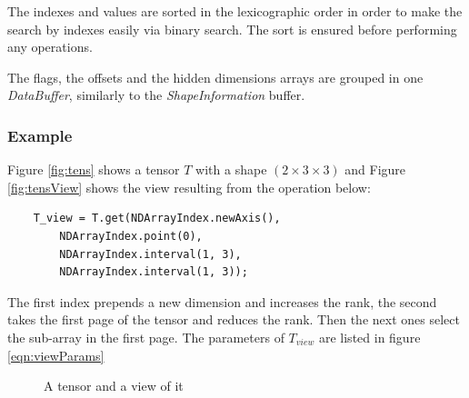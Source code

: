 		The indexes and values are sorted in the lexicographic order in order to make the search by indexes easily via binary search. The sort is ensured before performing any operations.
		
		The flags, the offsets and the hidden dimensions arrays are grouped in one \textit{DataBuffer}, similarly to the \textit{ShapeInformation} buffer.
		
\subsubsection{Example}
Figure \ref{fig:tens} shows a tensor $T$ with a shape $(2\times 3\times 3)$ and Figure \ref{fig:tensView} shows the view resulting from the operation below:

\begin{lstlisting}
	T_view = T.get(NDArrayIndex.newAxis(), 
		NDArrayIndex.point(0),
		NDArrayIndex.interval(1, 3), 
		NDArrayIndex.interval(1, 3));
\end{lstlisting}

The first index prepends a new dimension and increases the rank, the second takes the first page of the tensor and reduces the rank. Then the next ones select the sub-array in the first page. The parameters of $T_{view}$ are listed in figure \ref{eqn:viewParams} 

\begin{figure}[!h]
	\centering
	\qquad
	\qquad


	\caption{A tensor and a view of it }
	\label{fig:example}
\end{figure}
	

